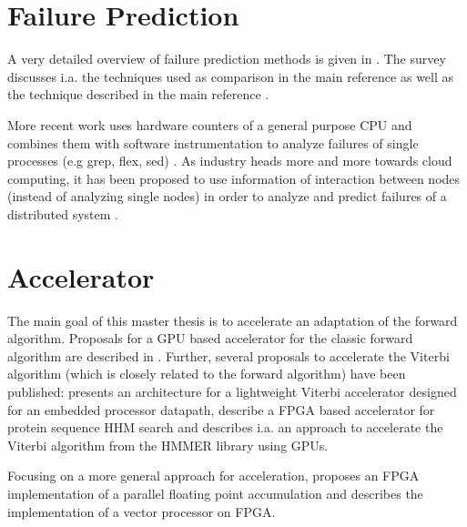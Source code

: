 \documentclass[mscthesis]{usiinfthesis}
\begin{document}
\section{Failure Prediction}
\label{ch:art_pred}
A very detailed overview of failure prediction methods is given in
\cite{ACM10_Salfner}. The survey discusses i.a. the techniques used as
comparison in the main reference
\cite{lin88,IEEE90_lin,ICDM02_Vilalta,domeniconi02} as well as the technique
described in the main reference \cite{salfner08}.

More recent work uses hardware counters of a general purpose CPU and combines
them with software instrumentation to analyze failures of single processes (e.g
grep, flex, sed) \cite{FSE10_Yilmaz}. As industry heads more and more
towards cloud computing, it has been proposed to use information of interaction
between nodes (instead of analyzing single nodes) in order to analyze and
predict failures of a distributed system \cite{IEEE12_Salfner,DSN10_Oliner}.

\section{Accelerator}
\label{ch:art_acc}
The main goal of this master thesis is to accelerate an adaptation of the
forward algorithm. Proposals for a GPU based accelerator for the classic
forward algorithm are described in \cite{neumann11,liu09}. Further, several
proposals to accelerate the Viterbi algorithm (which is closely related to the
forward algorithm) have been published: \cite{ASAP12_Azhar} presents an
architecture for a lightweight Viterbi accelerator designed for an embedded
processor datapath, \cite{IPDPS07_Jacob,ICS06_Maddimsetty,IPDPS07_Oliver}
describe a FPGA based accelerator for protein sequence HHM search and
\cite{IPDPS09_Walters} describes i.a. an approach to accelerate the Viterbi
algorithm from the HMMER library using GPUs.

Focusing on a more general approach for acceleration, \cite{ARITH13_Kadric}
proposes an FPGA implementation of a parallel floating point accumulation and
\cite{ITNG07_Yang} describes the implementation of a vector processor on
FPGA.
\end{document}
